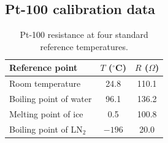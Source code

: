 \documentclass[11pt,a4paper]{article}
\begin{document}
\subsection{Pt-100 calibration data}
\begin{table}[H]
\centering
\caption{Pt-100 resistance at four standard reference temperatures.}
\begin{tabular}{lcc}
\toprule
Reference point & $T$ ($^{\circ}$C) & $R$ ($\Omega$) \\
\midrule
Room temperature   & 24.8   & 110.1 \\
Boiling point of water & 96.1  & 136.2 \\
Melting point of ice   & 0.5   & 100.8 \\
Boiling point of LN$_2$ & $-196$ & 20.0 \\
\bottomrule
\end{tabular}
\end{table}
\end{document}
